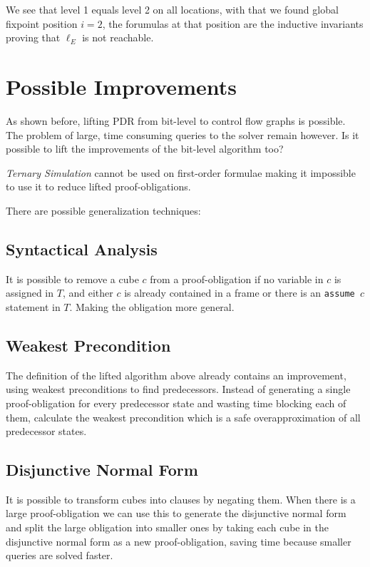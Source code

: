 \documentclass[11pt, a4paper, BCOR=10mm, ngerman]{scrbook}
\begin{document}
\hspace*{5cm}

We see that level 1 equals level 2 on all locations, with that we found global fixpoint position $i = 2$, the forumulas at that position are the inductive invariants proving that $\ell_E$ is not reachable.


\section{Possible Improvements}
\label{improvements}

As shown before, lifting PDR from bit-level to control flow graphs is possible. The problem of large, time consuming queries to the solver remain however. Is it possible to lift the improvements of the bit-level algorithm too? \par

\textsl{Ternary Simulation} cannot be used on first-order formulae making it impossible to use it to reduce lifted proof-obligations. \par
There are possible generalization techniques: \par
\subsection{Syntactical Analysis}
It is possible to remove a cube $c$ from a proof-obligation if no variable in $c$ is assigned in $T$, and either $c$ is already contained in a frame or there is an \texttt{assume $c$} statement in $T$. Making the obligation more general.


\subsection{Weakest Precondition}
The definition of the lifted algorithm above already contains an improvement, using weakest preconditions to find predecessors. Instead of generating a single proof-obligation for every predecessor state and wasting time blocking each of them, calculate the weakest precondition which is a safe overapproximation of all predecessor states. \\


\subsection{Disjunctive Normal Form}
It is possible to transform cubes into clauses by negating them. When there is a large proof-obligation we can use this to generate the disjunctive normal form and split the large obligation into smaller ones by taking each cube in the disjunctive normal form as a new proof-obligation, saving time because smaller queries are solved faster.
\end{document}

